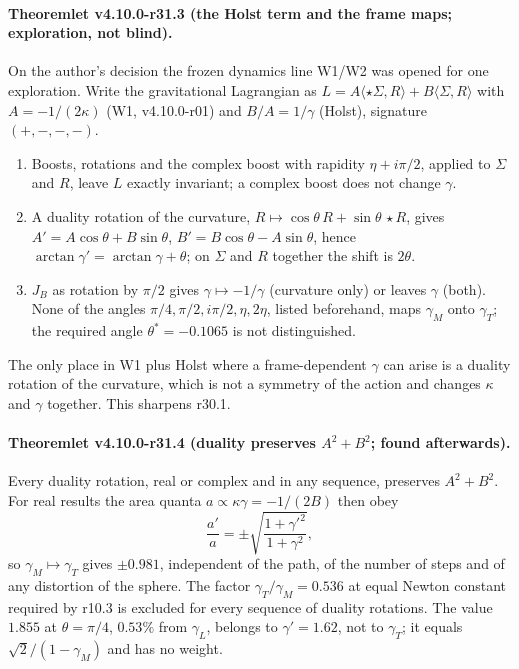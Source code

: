 \paragraph{Theoremlet v4.10.0-r31.3 (the Holst term and the frame maps; exploration, not blind).}
On the author's decision the frozen dynamics line W1/W2 was opened for one exploration.  Write the gravitational Lagrangian as
\(L=A\langle\star\Sigma,R\rangle+B\langle\Sigma,R\rangle\) with \(A=-1/(2\kappa)\) (W1, v4.10.0-r01) and \(B/A=1/\gamma\) (Holst), signature \((+,-,-,-)\).
\begin{enumerate}[leftmargin=2em]
\item[(a)] Boosts, rotations and the complex boost with rapidity \(\eta+i\pi/2\), applied to \(\Sigma\) and \(R\), leave \(L\) exactly invariant; a
complex boost does not change \(\gamma\).
\item[(b)] A duality rotation of the curvature, \(R\mapsto\cos\theta\,R+\sin\theta\,\star R\), gives \(A'=A\cos\theta+B\sin\theta\),
\(B'=B\cos\theta-A\sin\theta\), hence \(\arctan\gamma'=\arctan\gamma+\theta\); on \(\Sigma\) and \(R\) together the shift is \(2\theta\).
\item[(c)] \(J_B\) as rotation by \(\pi/2\) gives \(\gamma\mapsto-1/\gamma\) (curvature only) or leaves \(\gamma\) (both).  None of the angles
\(\pi/4,\pi/2,i\pi/2,\eta,2\eta\), listed beforehand, maps \(\gamma_M\) onto \(\gamma_T\); the required angle \(\theta^*=-0.1065\) is not distinguished.
\end{enumerate}
The only place in W1 plus Holst where a frame-dependent \(\gamma\) can arise is a duality rotation of the curvature, which is not a symmetry
of the action and changes \(\kappa\) and \(\gamma\) together.  This sharpens r30.1.

\paragraph{Theoremlet v4.10.0-r31.4 (duality preserves \(A^2+B^2\); found afterwards).}
Every duality rotation, real or complex and in any sequence, preserves \(A^2+B^2\).  For real results the area quanta
\(a\propto\kappa\gamma=-1/(2B)\) then obey
\[
\frac{a'}{a}=\pm\sqrt{\frac{1+\gamma'^2}{1+\gamma^2}},
\]
so \(\gamma_M\mapsto\gamma_T\) gives \(\pm0.981\), independent of the path, of the number of steps and of any distortion of the sphere.  The
factor \(\gamma_T/\gamma_M=0.536\) at equal Newton constant required by r10.3 is excluded for every sequence of duality rotations.  The
value \(1.855\) at \(\theta=\pi/4\), \(0.53\%\) from \(\gamma_L\), belongs to \(\gamma'=1.62\), not to \(\gamma_T\); it equals \(\sqrt2/(1-\gamma_M)\) and has
no weight.

